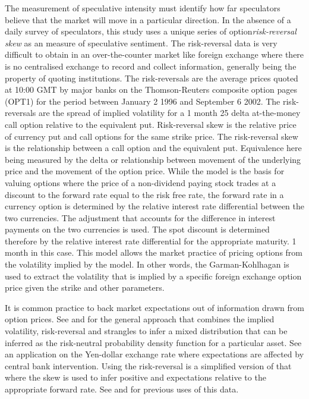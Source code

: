 \documentclass[ijfs,article,submit,oneauthor,pdftex,10pt,a4paper]{mdpi}
\begin{document}
{{The measurement of speculative intensity must identify how far speculators believe that the market will move in a particular direction. In the absence of a daily survey of speculators, this study uses a unique series of option\emph{risk-reversal skew} as an measure of speculative sentiment.  The risk-reversal data is very difficult to obtain in an over-the-counter market like foreign exchange where there is no centralised exchange to record and collect information, generally being the property of quoting institutions.  The risk-reversals are the average prices quoted at 10:00 GMT by major banks on the Thomson-Reuters composite option pages (OPT1)  for the period between January 2 1996 and September 6 2002.  The risk-reversals are the spread of implied volatility for a 1 month 25 delta at-the-money call option relative to the equivalent put.  Risk-reversal skew is the relative price of currency put and call options for the same strike price.} The risk-reversal skew is the relationship between a call option and the equivalent put. Equivalence here being measured by the delta or relationship between movement of the underlying price and the movement of the option price.  While the \citet{Black1973Options} model is the basis for valuing options where the price of a non-dividend paying stock trades at a discount to the forward rate equal to the risk free rate, the forward rate in a currency option is determined by the relative interest rate differential between the two currencies.   The \citet{GarmanKohlhagan} adjustment that accounts for the difference in interest payments on the two currencies is used.   The spot discount is determined therefore by the relative interest rate differential for the appropriate maturity.  1 month in this case.  This model allows the market practice of pricing options from the volatility implied by the model.  In other words, the Garman-Kohlhagan is used to extract the volatility that is implied by a specific foreign exchange option price given the strike and other parameters.    

It is common practice to back market expectations out of information drawn from option prices.  See \citet{Malickoption} and \citet{Pochin} for the general approach that combines the implied volatility, risk-reversal and strangles to infer a mixed distribution that can be inferred as the risk-neutral probability density function for a particular asset. See \citet{Gaati} an application on the Yen-dollar exchange rate where expectations are affected by central bank intervention. Using the risk-reversal is a simplified version of that where the skew is used to infer positive and expectations relative to the appropriate forward rate.  See \citet{Eitrheim} and \citet{ECBRR} for previous uses of this data.} 
\end{document}
